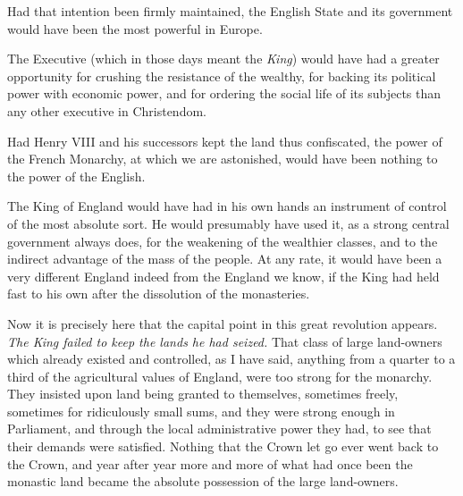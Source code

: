 \documentclass{book}
\begin{document}
Had that intention been firmly maintained, the English State and its government would have been the most powerful in Europe.

The Executive (which in those days meant the \emph{King}) would have had a greater opportunity for crushing the resistance of the wealthy, for backing its political power with economic power, and for ordering the social life of its subjects than any other executive in Christendom.

Had Henry VIII and his successors kept the land thus confiscated, the power of the French Monarchy, at which we are astonished, would have been nothing to the power of the English.

The King of England would have had in his own hands an instrument of control of the most absolute sort. He would presumably have used it, as a strong central government always does, for the weakening of the wealthier classes, and to the indirect advantage of the mass of the people. At any rate, it would have been a very different England indeed from the England we know, if the King had held fast to his own after the dissolution of the monasteries.

Now it is precisely here that the capital point in this great revolution appears. \emph{The King failed to keep the lands he had seized.} That class of large land-owners which already existed and controlled, as I have said, anything from a quarter to a third of the agricultural values of England, were too strong for the monarchy. They insisted upon land being granted to themselves, sometimes freely, sometimes for ridiculously small sums, and they were strong enough in Parliament, and through the local administrative power they had, to see that their demands were satisfied. Nothing that the Crown let go ever went back to the Crown, and year after year more and more of what had once been the monastic land became the absolute possession of the large land-owners.
\end{document}
